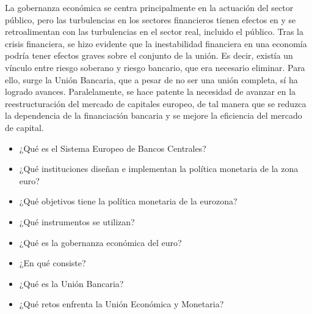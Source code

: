 \documentclass{nuevotema}
\begin{document}
La gobernanza económica se centra principalmente en la actuación del sector público, pero las turbulencias en los sectores financieros tienen efectos en y se retroalimentan con las turbulencias en el sector real, incluido el público. Tras la crisis financiera, se hizo evidente que la inestabilidad financiera en una economía podría tener efectos graves sobre el conjunto de la unión. Es decir, existía un vínculo entre riesgo soberano y riesgo bancario, que era necesario eliminar. Para ello, surge la Unión Bancaria, que a pesar de no ser una unión completa, sí ha logrado avances. Paralelamente, se hace patente la necesidad de avanzar en la reestructuración del mercado de capitales europeo, de tal manera que se reduzca la dependencia de la financiación bancaria y se mejore la eficiencia del mercado de capital. 


\begin{itemize}
	\item ¿Qué es el Sistema Europeo de Bancos Centrales?
	\item ¿Qué instituciones diseñan e implementan la política monetaria de la zona euro?
	\item ¿Qué objetivos tiene la política monetaria de la eurozona?
	\item ¿Qué instrumentos se utilizan?
	\item ¿Qué es la gobernanza económica del euro?
	\item ¿En qué consiste?
	\item ¿Qué es la Unión Bancaria?
	\item ¿Qué retos enfrenta la Unión Económica y Monetaria?
\end{itemize}

\esquemacorto
\end{document}
